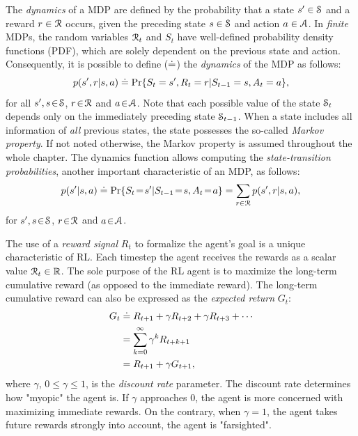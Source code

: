 \documentclass[a4paper, 12pt]{article}
\begin{document}
The \emph{dynamics} of a MDP are defined by the probability that a state \(s'\in \S\)
and a reward \(r\in\R\) occurs, given the preceding state \(s\in\S\) and action
\(a\in\A\). In \emph{finite} MDPs, the random variables \(\R_t\) and \(S_t\) have
well-defined probability density functions (PDF), which are solely dependent on
the previous state and action. Consequently, it is possible to define (\(\defeq\))
the \emph{dynamics} of the MDP as follows:
\begin{equation}
    p(s',r|s,a) \defeq \Pr{S_t=s',R_t=r|S_{t-1}=s,A_t=a},
\end{equation}
for all \(s',s\!\in\!\S\), \(r\!\in\!\R\) and \(a\!\in\!\A\). Note that each possible
value of the state \(\S_t\) depends only on the immediately preceding state
\(\S_{t-1}\). When a state includes all information of \emph{all} previous states, the
state possesses the so-called \emph{Markov property}. If not noted otherwise, the
Markov property is assumed throughout the whole chapter. The dynamics function
allows computing the \emph{state-transition probabilities}, another important
characteristic of an MDP, as follows:
\begin{equation}
    p(s'|s,a) \defeq \Pr{S_t\!=\!s'|S_{t-1}\!=\!s,A_t\!=\!a} = \sum_{r\in\R}{p(s', r|s, a)},
\end{equation}
for \(s',s\!\in\!\S\), \(r\!\in\!\R\) and \(a\!\in\!\A\).

The use of a \emph{reward signal} \(R_t\) to formalize the agent's goal is a unique
characteristic of RL. Each timestep the agent receives the rewards as a scalar
value \(\R_t\in\Re\). The sole purpose of the RL agent is to maximize the
long-term cumulative reward (as opposed to the immediate reward). The long-term
cumulative reward can also be expressed as the \emph{expected return} \(G_t\):
\begin{equation} \label{eq-expected-return}
\begin{split}
    G_t &\defeq R_{t+1} + \gamma R_{t+2} + \gamma R_{t+3} + \cdots \\
    &= \sum_{k=0}^{\infty}{\gamma^k R_{t+k+1}} \\
    &= R_{t+1} + \gamma G_{t+1},
\end{split}
\end{equation}
where \(\gamma\), \(0\leq\gamma\leq 1\), is the \emph{discount rate} parameter. The
discount rate determines how "myopic" the agent is. If \(\gamma\) approaches 0,
the agent is more concerned with maximizing immediate rewards. On the contrary,
when \(\gamma\!=\! 1\), the agent takes future rewards strongly into account, the
agent is "farsighted".
\end{document}
